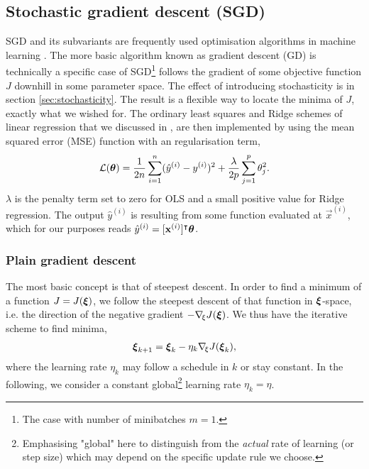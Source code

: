 \subsection{Stochastic gradient descent (SGD)}\label{sec:stochastic_gradient_descent}
    SGD and its subvariants are frequently used optimisation algorithms in machine learning \citep{Goodfellow2016}. The more basic algorithm known as gradient descent (GD) is technically a specific case of SGD\footnote{The case with number of minibatches $m=1$.} follows the gradient of some objective function $J$ downhill in some parameter space. The effect of introducing stochasticity is  in section \ref{sec:stochasticity}. The result is a flexible way to locate the minima of  $J$, exactly what we wished for. The ordinary least squares and Ridge schemes of linear regression that we discussed in \projectOne, are then implemented by using the mean squared error (MSE) function with an \lnorm[2] regularisation term,
    \begin{equation}\label{eq:linear_regression_cost_function}
        \mathcal{L}(\boldsymbol{\theta}) = \frac{1}{2n} \sum_{i=1}^n (\hat{y}^{(i)}-y^{(i)})^2 + \frac{\lambda}{2p} \sum_{j=1}^{p} \theta_j^2. 
    \end{equation}
    $\lambda$ is the penalty term set to zero for OLS and a small positive value for Ridge regression. The output $\hat{y}^{(i)}$ is resulting from some function evaluated at $\vec{x}^{(i)}$, which for our purposes reads $\hat{y}^{(i)} = [\mathbf{x}^{(i)}]^\intercal \boldsymbol{\theta}$.
 
    \subsubsection{Plain gradient descent}\label{sec:plain_gradient_descent}
        The most basic concept is that of steepest descent. In order to find a minimum of a function $J=J(\boldsymbol{\xi})$, we follow the steepest descent of that function in $\boldsymbol{\xi}$-space, i.e. the direction of the negative gradient $-\nabla_{\!\xi} J(\boldsymbol{\xi})$. We thus have the iterative scheme to find minima,
        \begin{align}\label{eq:steepest_descent}
            \boldsymbol{\xi}_{k+1} = \boldsymbol{\xi}_k - \eta_k\nabla_{\!\xi} J(\boldsymbol{\xi}_k),
        \end{align}
        where the learning rate $\eta_k$ may follow a schedule in $k$ or stay constant. In the following, we consider a constant global\footnote{Emphasising "global" here to distinguish from the \textit{actual} rate of learning (or step size) which may depend on the specific update rule we choose.} learning rate $\eta_k=\eta$.


